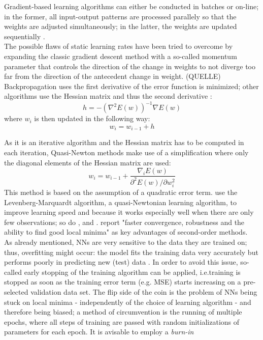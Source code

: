 \documentclass[a4paper, 11pt]{article}
\begin{document}
Gradient-based learning algorithms can either be conducted in batches or on-line; in the former, all input-output patterns are processed parallely so that the weights are adjusted simultaneously; in the latter, the weights are updated sequentially \citep{Rojas.1996}.\\

The possible flaws of static learning rates have been tried to overcome by expanding the classic gradient descent method with a so-called momentum parameter that controls the direction of the change in weights to not diverge too far from the direction of the antecedent change in weight. (QUELLE)
\\
Backpropagation uses the first derivative of the error function is minimized; other algorithms use the Hessian matrix and thus the second derivative \citep{Rojas.1996}:
\begin{equation}
h = - (\nabla^2E(w))^{-1}\nabla E(w)
\end{equation}
where $w_{i}$ is then updated in the following way:
\begin{equation}
	w_{i} = w_{i-1} + h
\end{equation}

As it is an iterative algorithm and the Hessian matrix has to be computed in each iteration, Quasi-Newton methods make use of a simplification where only the diagonal elements of the Hessian matrix are used:
\begin{equation}
	w_{i} = w_{i-1} + \frac{\nabla_{i}E(w)}{\partial^{2}E(w)/\partial w_{i}^{2}}
\end{equation}
This method is based on the assumption of a quadratic error term.
\cite{Pinto.2005} use the Levenberg-Marquardt algorithm, a quasi-Newtonian learning algorithm, to improve learning speed and because it works especially well when there are only few observations; so do \cite{Benkachcha.2015}, \cite{Kourentzes.2014} and \cite{Zhou.2006}. \cite{Zhang.1998} report "faster convergence, robustness and the ability to find good local minima" as key advantages of second-order methods.\\

As already mentioned, NNs are very sensitive to the data they are trained on; thus, overfitting might occur: the model fits the training data very accurately but performs poorly in predicting new (test) data \citep{Nakamura.2005}. In order to avoid this issue, so-called early stopping of the training algorithm can be applied, i.e.training is stopped as soon as the training error term (e.g. MSE) starts increasing on a pre-selected validation data set.
The flip side of the coin is the problem of NNs being stuck on local minima - independently of the choice of learning algorithm \citep{Zhang.1998} - and therefore being biased; a method of circumvention is the running of multiple epochs, where all steps of training are passed with random initializations of parameters for each epoch. It is avisable to employ a \textit{burn-in} 
\end{document}
